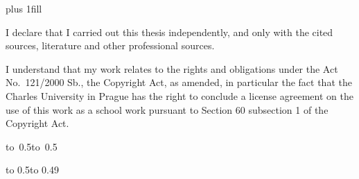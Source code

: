 \newpage



\openright

\noindent
\Dedication

\newpage


\openright
\hypersetup{pageanchor=true}
\pagestyle{plain}
\vglue 0pt plus 1fill

\noindent
I declare that I carried out this \ThesisType{} thesis independently, and only with the cited
sources, literature and other professional sources.

\medskip\noindent
I understand that my work relates to the rights and obligations under the Act No.~121/2000 Sb.,
the Copyright Act, as amended, in particular the fact that the Charles
University in Prague has the right to conclude a license agreement on the use of this
work as a school work pursuant to Section 60 subsection 1 of the Copyright Act.

\vspace{10mm}

\hbox{\hbox to 0.5\hbox to 0.5}

\vspace{20mm}
\newpage


\openright

\vbox to 0.5\nobreak\vbox to 0.49

\newpage


\openright
\pagestyle{plain}
\setcounter{page}{1}
